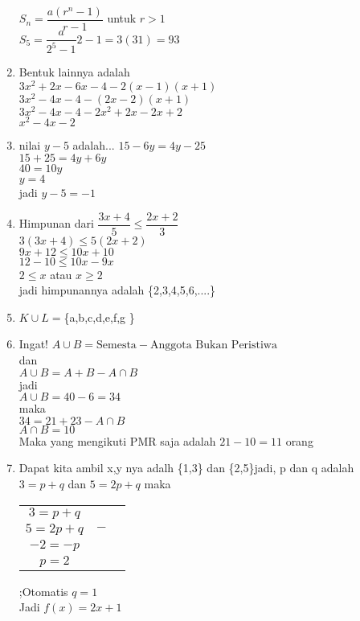 \documentclass[10pt,a4paper]{article}
\begin{document}
\begin{enumerate}
		$S_n=\dfrac{a(r^n-1)}{r-1} $ untuk $r>1$\bigskip \\
		$S_5=\dfrac a{2^5-1}{2-1}=3(31)=93$
	\item Bentuk lainnya adalah \\
	    $3x^2+2x-6x-4-2(x-1)(x+1)$\\
	    $3x^2-4x-4-(2x-2)(x+1)$\\
	    $3x^2-4x-4-2x^2+2x-2x+2 $\\
	    $x^2-4x-2$
	 \item nilai $y-5$ adalah...
		$15-6y=4y-25$\\
		$15+25=4y+6y$\\
		$40=10y$\\
		$y=4$\\
		jadi $y-5=-1$
	\item Himpunan dari $\dfrac{3x+4}{5}\leq \dfrac{2x+2}{3}$\\
		  $3(3x+4)\leq 5(2x+2)$\\
		  $9x+12\leq 10x+10$\\
		  $12-10\leq 10x-9x$\\
		  $2\leq x$ atau
		  $x\geq 2$\\
		  jadi himpunannya adalah \{2,3,4,5,6,....\}
	\item $K\cup L=$\{a,b,c,d,e,f,g \}
	\item Ingat! $A \cup B=\text{Semesta}-\text{Anggota Bukan Peristiwa}$\\
	dan\\
	$A\cup B=A+B-A\cap B$ \\
	jadi \\
	$A\cup B= 40-6=34$ \\
	maka\\
	$34=21+23-A\cap B$\\
	$A\cap B=10$
	\\
	Maka yang mengikuti PMR saja adalah $21-10=11$ orang
	\item Dapat kita ambil x,y nya adalh \{1,3\} dan \{2,5\}jadi,
	p dan q adalah\\
	$3=p+q$ dan $5=2p+q$ maka\\
	\begin{tabular}{ccc}
	$3=p+q$	&   \\ 
	$5=2p+q$& $-$ \\
	\hline
	$-2=-p$ & \\
	$p=2$ &
	\end{tabular}
	;Otomatis $q=1$\\
	
	Jadi $f(x)=2x+1$\\
	

\end{enumerate}
\end{document}
